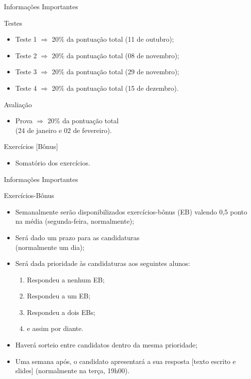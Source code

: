 \documentclass[xcolor=dvipsnames,table]{beamer}
\begin{document}
	\begin{frame}{Informações Importantes}
		\begin{block}{Testes}
			\begin{itemize}
				\item Teste 1 $\Rightarrow$ 20\% da pontuação total (11 de outubro);
				\item Teste 2 $\Rightarrow$ 20\% da pontuação total (08 de novembro);
				\item Teste 3 $\Rightarrow$ 20\% da pontuação total (29 de novembro);
				\item Teste 4 $\Rightarrow$  20\% da pontuação total (15 de dezembro).
			\end{itemize}
		\end{block}
		\begin{block}{Avaliação}
			\begin{itemize}
				\item Prova $\Rightarrow$  20\% da pontuação total \\
				(24 de janeiro e 02 de fevereiro).
			\end{itemize}
		\end{block}
		\begin{block}{Exercícios [Bônus]}
			\begin{itemize}
				\item Somatório dos exercícios.
			\end{itemize}
		\end{block}
	\end{frame}
    
    \begin{frame}{Informações Importantes}
		\begin{block}{Exercícios-Bônus}
			\begin{itemize}
				\item Semanalmente serão disponibilizados exercícios-bônus (EB) valendo 0,5 ponto na média (segunda-feira, normalmente); \pause
                \item Será dado um prazo para as candidaturas\\
                (normalmente um dia); \pause
                \item Será dada prioridade às candidaturas aos seguintes alunos: \pause
                	\begin{enumerate}
                    	\item Respondeu a nenhum EB; \pause
                        \item Respondeu a um EB; \pause
                        \item Respondeu a dois EBs; \pause
                        \item e assim por diante.
                    \end{enumerate} \pause
                \item Haverá sorteio entre candidatos dentro da mesma prioridade; \pause
            	\item Uma semana após, o candidato apresentará a sua resposta [texto escrito e slides] (normalmente na terça, 19h00).
			\end{itemize}
		\end{block}
	\end{frame}
	
\end{document}
